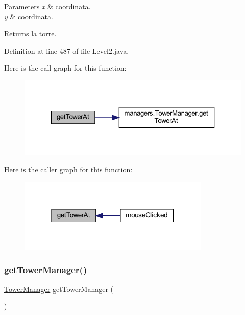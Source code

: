 \begin{DoxyParams}{Parameters}
{\em x} & coordinata. \\
\hline
{\em y} & coordinata.\\
\hline
\end{DoxyParams}
\begin{DoxyReturn}{Returns}
la torre. 
\end{DoxyReturn}


Definition at line 487 of file Level2.\+java.

Here is the call graph for this function\+:\nopagebreak
\begin{figure}[H]
\begin{center}
\leavevmode
\includegraphics[width=323pt]{classscenes_1_1_level2_a4345f2e80059788e5ab1dd1cf0ff2c04_cgraph}
\end{center}
\end{figure}
Here is the caller graph for this function\+:\nopagebreak
\begin{figure}[H]
\begin{center}
\leavevmode
\includegraphics[width=259pt]{classscenes_1_1_level2_a4345f2e80059788e5ab1dd1cf0ff2c04_icgraph}
\end{center}
\end{figure}
\mbox{\label{classscenes_1_1_level2_a6fff8a01141127e3c2897a077e5dee92}} 
\subsubsection{\texorpdfstring{get\+Tower\+Manager()}{getTowerManager()}}
{\footnotesize\ttfamily \hyperlink{classmanagers_1_1_tower_manager}{Tower\+Manager} get\+Tower\+Manager (\begin{DoxyParamCaption}{ }\end{DoxyParamCaption})}




